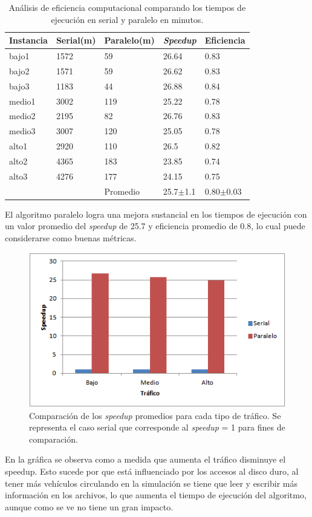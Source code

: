 \begin{table}[H]
	\renewcommand{\arraystretch}{1.2}
	\caption{Análisis de eficiencia computacional comparando los tiempos de ejecución en serial y paralelo en minutos. }
	\label{table:analisis_speedup}
	\centering
	\begin{tabular}{p{2.5cm}p{2.5cm}p{2.5cm}p{2.5cm}p{2.5cm} }
		\hline
		
		Instancia& 
		Serial(m) & 
		Paralelo(m) &
		\emph{Speedup} &
		Eficiencia
		\\ 
		\hline
		bajo1  & 1572 & 59 & 26.64 & 0.83\\
		bajo2  & 1571 & 59 & 26.62 & 0.83\\
		bajo3  & 1183 & 44 & 26.88 & 0.84\\
		
		medio1  & 3002 & 119 & 25.22 & 0.78\\
		medio2  & 2195 & 82 & 26.76 & 0.83\\
		medio3  & 3007 & 120 & 25.05 & 0.78\\
		
		alto1  & 2920 & 110 & 26.5 & 0.82\\
		alto2  & 4365 & 183 & 23.85 & 0.74\\
		alto3  & 4276 & 177 & 24.15 & 0.75\\
		\hline
		  &  & Promedio & 25.7$\pm$1.1 & 0.80$\pm$0.03\\
		
		\hline
	\end{tabular}
\end{table}


El algoritmo paralelo logra una mejora sustancial en los tiempos de ejecución con un valor promedio del \emph{speedup} de 25.7  y  eficiencia promedio de 0.8, lo cual puede considerarse como buenas métricas.

\begin{figure}[H]
	\centering
	\includegraphics[width=0.8\linewidth]{Figures/speedup1}
	\caption{Comparación de los \emph{speedup} promedios para cada tipo de tráfico. Se representa el caso serial que corresponde al \emph{speedup} = 1 para fines de comparación.}
	\label{fig:speedup1}
\end{figure}

En la gráfica se observa como a medida que aumenta el tráfico disminuye el speedup. Esto sucede por que está influenciado por los accesos al disco duro, al tener más vehículos circulando en la simulación se tiene que leer y escribir más información en los archivos, lo que aumenta el tiempo de ejecución del algoritmo, aunque como se ve no tiene un gran impacto.